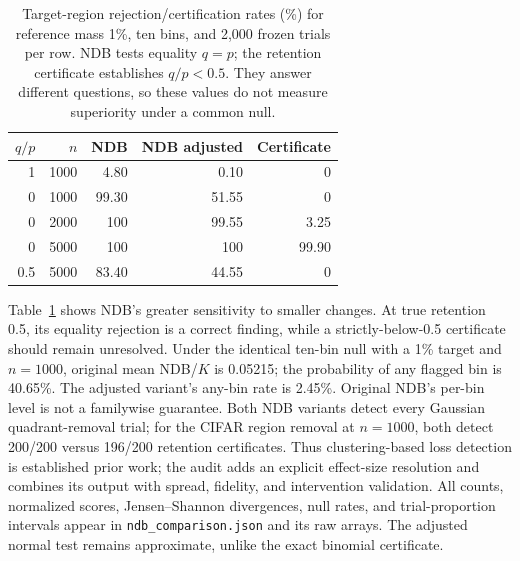 \begin{table}[t]
\centering\small
\begin{tabular}{rrrrr}
\toprule
$q/p$ & $n$ & NDB & NDB adjusted & Certificate\\
\midrule
1 &1000&4.80&0.10&0\\
0 &1000&99.30&51.55&0\\
0 &2000&100&99.55&3.25\\
0 &5000&100&100&99.90\\
0.5 &5000&83.40&44.55&0\\
\bottomrule
\end{tabular}
\caption{Target-region rejection/certification rates (\%) for reference mass
1\%, ten bins, and 2,000 frozen trials per row. NDB tests equality $q=p$;
the retention certificate establishes $q/p<0.5$. They answer different
questions, so these values do not measure superiority under a common null.}
\label{tab:support-ndb}
\end{table}

Table~\ref{tab:support-ndb} shows NDB's greater sensitivity to smaller changes.
At true retention 0.5, its equality rejection is a correct finding, while a
strictly-below-0.5 certificate should remain unresolved. Under the identical
ten-bin null with a 1\% target and $n=1000$, original mean NDB/$K$ is 0.05215;
the probability of any flagged bin is 40.65\%. The adjusted variant's any-bin
rate is 2.45\%. Original NDB's per-bin level is not a familywise guarantee.
Both NDB variants detect every Gaussian quadrant-removal trial; for the CIFAR
region removal at $n=1000$, both detect 200/200 versus 196/200 retention
certificates. Thus clustering-based loss detection is established prior work;
the audit adds an explicit effect-size resolution and combines its output with
spread, fidelity, and intervention validation. All counts, normalized scores,
Jensen--Shannon divergences, null rates, and trial-proportion intervals appear
in \texttt{ndb\_comparison.json} and its raw arrays. The adjusted normal test
remains approximate, unlike the exact binomial certificate.

